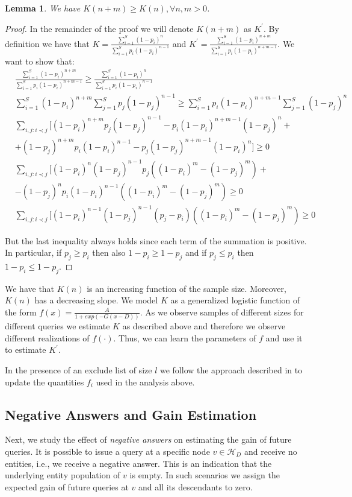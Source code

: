 \documentclass{vldb}
\newtheorem{lemma}{Lemma}
\newcommand{\hierarchy}{\mathcal{H}_D}
\begin{document}
\begin{lemma}
We have $K(n+m) \geq K(n), \forall n,m > 0$.
\end{lemma}
\begin{proof}
In the remainder of the proof we will denote $K(n+m)$ as $K^{\prime}$. By definition we have that $K = \frac{\sum_{i=1}^S (1-p_i)^n}{\sum_{i=1}^S p_i(1-p_i)^{n-1}}$ and $K^{\prime} = \frac{\sum_{i=1}^S (1-p_i)^{n+m}}{\sum_{i=1}^S p_i(1-p_i)^{n+m-1}}$. We want to show that:
{\small
\begin{align}
&\frac{\sum_{i=1}^S (1-p_i)^{n+m}}{\sum_{i=1}^S p_i(1-p_i)^{n+m-1}} \geq \frac{\sum_{i=1}^S (1-p_i)^n}{\sum_{i=1}^S p_i(1-p_i)^{n-1}} \nonumber \\
&\sum_{i=1}^S (1-p_i)^{n+m}\sum_{j=1}^S p_j(1-p_j)^{n-1} \geq \sum_{i=1}^S p_i(1-p_i)^{n+m-1}\sum_{j=1}^S (1-p_j)^n\nonumber \\
&\sum_{i,j:i\prec j}[(1-p_i)^{n+m}p_j(1-p_j)^{n-1} - p_i(1-p_i)^{n+m-1}(1-p_j)^n + \nonumber \\
& + (1-p_j)^{n+m}p_i(1-p_i)^{n-1} - p_j(1-p_j)^{n+m-1}(1-p_i)^n] \geq 0 \nonumber \\
&\sum_{i,j:i\prec j}[(1-p_i)^{n}(1-p_j)^{n-1}p_j((1-p_i)^{m} - (1-p_j)^{m})  + \nonumber \\
& - (1-p_j)^{n}p_i(1-p_i)^{n-1}((1-p_i)^{m} - (1-p_j)^{m}) \geq 0 \nonumber \\
&\sum_{i,j:i\prec j}[(1-p_i)^{n-1}(1-p_j)^{n-1}(p_j-p_i)((1-p_i)^{m} - (1-p_j)^{m}) \geq 0
\end{align}}

But the last inequality always holds since each term of the summation is positive. In particular, if $p_j \geq p_i$ then
also $1-p_i \geq 1-p_j$ and if $p_j \leq p_i$ then $1-p_i \leq 1-p_j$.
\end{proof}

We have that $K(n)$ is an increasing function of the sample size. Moreover, $K(n)$ has a decreasing slope. We model $K$ as a generalized logistic function of the form $f(x) = \frac{A}{1+exp(-G(x-D))}$. As we observe samples of different sizes for different queries we estimate $K$ as described above and therefore we observe different realizations of $f(\cdot)$. Thus, we can learn the parameters of $f$ and use it to estimate $K^{\prime}$.

In the presence of an exclude list of size $l$ we follow the approach described in  to update the quantities $f_i$ used in the analysis above. 

\subsection{Negative Answers and Gain Estimation}
Next, we study the effect of {\em negative answers} on estimating the gain of future queries. It is possible to issue a query at a specific node $v \in \hierarchy$ and receive no entities, i.e., we receive a negative answer. This is an indication that the underlying entity population of $v$ is empty. In such scenarios we assign the expected gain of future queries at $v$ and all its descendants to zero. 
\end{document}
